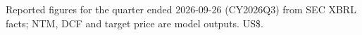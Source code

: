 \label{tab:key-data}
{\footnotesize Reported figures for the quarter ended 2026-09-26 (CY2026Q3) from SEC XBRL facts; NTM, DCF and target price are model outputs. US\$.\par}

